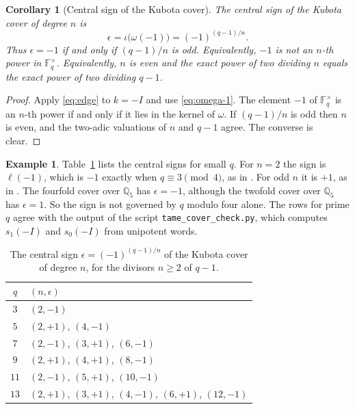 \documentclass[12pt,letterpaper]{article}
\numberwithin{equation}{section}
\newtheorem{corollary}[theorem]{Corollary}
\theoremstyle{definition}
\newtheorem{example}[theorem]{Example}
\theoremstyle{remark}
\newcommand{\kk}{\mathbb F_q}
\newcommand{\sgn}{\epsilon}
\begin{document}
\begin{corollary}[Central sign of the Kubota cover]\label{cor:kubotasign}
The central sign of the Kubota cover of degree $n$ is
\[
 \sgn=\iota\bigl(\omega(-1)\bigr)=(-1)^{(q-1)/n}.
\]
Thus $\sgn=-1$ if and only if $(q-1)/n$ is odd. Equivalently, $-1$ is not an $n$-th power in $\kk^\times$. Equivalently, $n$ is even and the exact power of two dividing $n$ equals the exact power of two dividing $q-1$.
\end{corollary}
\begin{proof}
Apply \eqref{eq:edge} to $k=-I$ and use \eqref{eq:omega-1}. The element $-1$ of $\kk^\times$ is an $n$-th power if and only if it lies in the kernel of $\omega$. If $(q-1)/n$ is odd then $n$ is even, and the two-adic valuations of $n$ and $q-1$ agree. The converse is clear.
\end{proof}

\begin{example}\label{ex:signtable}
Table~\ref{tab:signs} lists the central signs for small $q$. For $n=2$ the sign is $\ell(-1)$, which is $-1$ exactly when $q\equiv3\pmod4$, as in \cite{Jo26b}. For odd $n$ it is $+1$, as in \cite{Jo26a}. The fourfold cover over $\mathbb Q_5$ has $\sgn=-1$, although the twofold cover over $\mathbb Q_5$ has $\sgn=1$. So the sign is not governed by $q$ modulo four alone. The rows for prime $q$ agree with the output of the script \texttt{tame\_cover\_check.py}, which computes $s_1(-I)$ and $s_0(-I)$ from unipotent words.
\end{example}

\begin{table}[ht]
\centering
\caption{The central sign $\sgn=(-1)^{(q-1)/n}$ of the Kubota cover of degree $n$, for the divisors $n\ge2$ of $q-1$.}\label{tab:signs}
\vspace{4pt}
\small
\begin{tabular}{@{}cl@{}}
\toprule
$q$ & $(n,\sgn)$\\
\midrule
$3$ & $(2,-1)$\\
$5$ & $(2,+1)$, $(4,-1)$\\
$7$ & $(2,-1)$, $(3,+1)$, $(6,-1)$\\
$9$ & $(2,+1)$, $(4,+1)$, $(8,-1)$\\
$11$ & $(2,-1)$, $(5,+1)$, $(10,-1)$\\
$13$ & $(2,+1)$, $(3,+1)$, $(4,-1)$, $(6,+1)$, $(12,-1)$\\
\bottomrule
\end{tabular}
\end{table}
\end{document}
